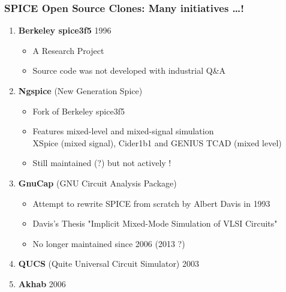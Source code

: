 
\begin{frame}
  \frametitle{SPICE Open Source Clones: Many initiatives \ldots !}
  \begin{enumerate}
  \item \textbf{Berkeley spice3f5} \alert{1996}
    \begin{itemize}
    \item A Research Project
    \item Source code \alert{was not developed with industrial Q\&A}
    \end{itemize}
  \item \textbf{Ngspice} (New Generation Spice)
    \begin{itemize}
    \item \alert{Fork of Berkeley spice3f5}
    \item Features mixed-level and mixed-signal simulation \\
      XSpice (mixed signal), Cider1b1 and GENIUS TCAD (mixed level)
    \item \alert{Still maintained (?) but not actively !}
    \end{itemize}
  \item \textbf{GnuCap} (GNU Circuit Analysis Package)
    \begin{itemize}
    \item Attempt to rewrite SPICE from scratch by Albert Davis in \alert{1993}
    \item Davis's Thesis "Implicit Mixed-Mode Simulation of VLSI Circuits"
    \item No longer maintained since 2006 (2013 ?)
    \end{itemize}
  \item \textbf{QUCS} (Quite Universal Circuit Simulator) \alert{2003}
  \item \textbf{Akhab} \alert{2006}
  \end{enumerate}
\end{frame}

